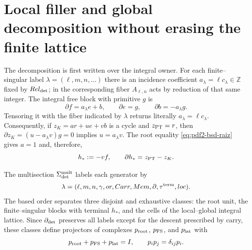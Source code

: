 \section{Local filler and global decomposition without erasing the finite lattice}

The decomposition is first written over the integral owner. For
each finite--singular label $\lambda=(\ell,m,n,\ldots)$ there is an
incidence coefficient $a_\lambda=\ell c_\lambda\in\mathbb Z$ fixed by
$\operatorname{Rel}_{\rm det}$; in the corresponding fiber
$A_{\ell,n}$ acts by reduction of that same integer. The integral
free block with primitive $g$ is
\begin{equation}\label{eq:pdf2-bsd-bloque-normal}
 \partial f=a_\lambda e+b,\qquad
 \partial e=g,\qquad
 \partial b=-a_\lambda g.
\end{equation}
Tensoring it with the fiber indicated by $\lambda$ returns literally
$a_\lambda=\ell c_\lambda$. Consequently, if
$z_K=ar+ue+vb$ is a cycle and $z_{\rm PT}=r$, then
$\partial z_K=(u-a_\lambda v)g=0$ implies $u=a_\lambda v$. The root equality
\eqref{eq:pdf2-bsd-raiz} gives $a=1$ and, therefore,
\begin{equation}\label{eq:pdf2-bsd-filler-local}
 h_*:=-vf,\qquad \partial h_*=z_{\rm PT}-z_K.
\end{equation}

The multisection $\Sigma_{\rm det}^{\rm mult}$ labels each generator by
\begin{equation}\label{eq:pdf2-bsd-etiqueta-completa}
 \lambda=(\ell,m,n,\gamma,\operatorname{or},\operatorname{Carr},
 \operatorname{Mem},\partial,\tau^{\rm term},\operatorname{loc}).
\end{equation}
The based order separates three disjoint and exhaustive classes: the root unit, the finite--singular blocks with terminal $h_*$, and the cells of the local--global integral lattice. Since $\partial_{\rm det}$ preserves all labels except for the descent prescribed by carry, these classes define projectors of complexes $p_{\rm root}$, $p_{\rm FS}$, and $p_{\rm lat}$ with
\begin{equation}\label{eq:pdf2-bsd-tres-proyectores}
 p_{\rm root}+p_{\rm FS}+p_{\rm lat}=I,
 \qquad p_ip_j=\delta_{ij}p_i.
\end{equation}

